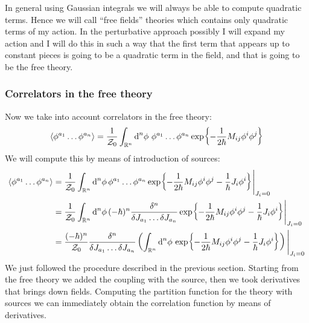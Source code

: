\documentclass[../main/main.tex]{subfiles}
\begin{document}
In general using Gaussian integrals we will always be able to compute quadratic terms. Hence we will call ``free fields'' theories which contains only quadratic terms of my action. In the perturbative approach possibly I will expand my action and I will do this in such a way that the first term that appears up to constant pieces is going to be a quadratic term in the field, and that is going to be the free theory. 

\subsubsection{Correlators in the free theory}

Now we take into account correlators in the free theory:
\[\langle\phi^{a_1}\dots\phi^{a_n}\rangle=\frac1{\mathcal Z_0}\int_{\mathbb{R}^n}\textup{d}^n\phi\,\,\phi^{a_1}\dots\phi^{a_n}\exp{-\frac1{2\hbar}M_{ij}\phi^i\phi^j}\]
We will compute this by means of introduction of sources:
\begin{align*}
\langle\phi^{a_1}\dots\phi^{a_n}\rangle
&=\frac1{\mathcal Z_0}\int_{\mathbb{R}^n}\textup{d}^n\phi\,\phi^{a_1}\dots\phi^{a_n}\exp{-\frac1{2\hbar}M_{ij}\phi^i\phi^j-\frac{1}\hbar J_i\phi^i}\Bigg\vert_{J_i=0}\\
&=\frac1{\mathcal Z_0}\int_{\mathbb{R}^n}\textup{d}^n\phi\,(-\hbar)^n\frac{\delta^n}{\delta J_{a_1}\dots \delta J_{a_n}}\exp{-\frac1{2\hbar}M_{ij}\phi^i\phi^j-\frac{1}\hbar J_i\phi^i}\Bigg\vert_{J_i=0}\\
&=\frac{(-\hbar)^n}{\mathcal Z_0}\frac{\delta^n}{\delta J_{a_1}\dots \delta J_{a_n}}\left(\int_{\mathbb{R}^n}\textup{d}^n\phi\,\exp{-\frac1{2\hbar}M_{ij}\phi^i\phi^j-\frac{1}\hbar J_i\phi^i}\right)\Bigg\vert_{J_i=0}
\end{align*}
We just followed the procedure described in the previous section. Starting from the free theory we added the coupling with the source, then we took derivatives that brings down fields. Computing the partition function for the theory with sources we can immediately obtain the correlation function by means of derivatives. 
\end{document}
